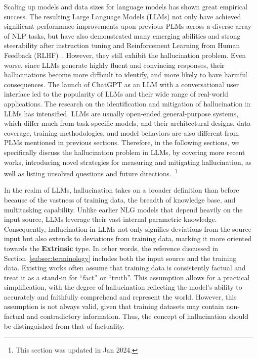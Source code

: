 \label{section: LLM}
Scaling up models and data sizes for language models has shown great empirical success. The resulting Large Language Models (LLMs) not only have achieved significant performance improvements upon previous PLMs across a diverse array of NLP tasks, but have also demonstrated many emerging abilities and strong steerability after instruction tuning and Reinforcement Learning from Human Feedback (RLHF)~. However, they still exhibit the hallucination problem. Even worse, since LLMs generate highly fluent and convincing responses, their hallucinations become more difficult to identify, and more likely to have harmful consequences. The launch of ChatGPT as an LLM with a conversational user interface led to the popularity of LLMs and their wide range of real-world applications. The research on the identification and mitigation of hallucination in LLMs has intensified. LLMs are usually open-ended general-purpose systems, which differ much from task-specific models, and their architectural designs, data coverage, training methodologies, and model behaviors are also different from PLMs mentioned in previous sections. Therefore, in the following sections, we specifically discuss the hallucination problem in LLMs, by covering more recent works, introducing novel strategies for measuring and mitigating hallucination, as well as listing unsolved questions and future directions.~\footnote{This section was updated in Jan 2024.}

In the realm of LLMs, hallucination takes on a broader definition than before because of the vastness of training data, the breadth of knowledge base, and multitasking capability. 
Unlike earlier NLG models that depend heavily on the input source, LLMs leverage their vast internal parametric knowledge.
Consequently, hallucination in LLMs not only signifies deviations from the source input but also extends to deviations from training data, marking it more oriented towards the \textbf{Extrinsic} type. 
In other words, the reference discussed in Section~\ref{subsec:terminology} includes both the input source and the training data. 
Existing works often assume that training data is consistently factual and treat it as a stand-in for ``fact'' or ``truth''.
This assumption allows for a practical simplification, with the degree of hallucination reflecting the model's ability to accurately and faithfully comprehend and represent the world.
However, this assumption is not always valid, given that training datasets may contain non-factual and contradictory information.
Thus, the concept of hallucination should be distinguished from that of factuality.

